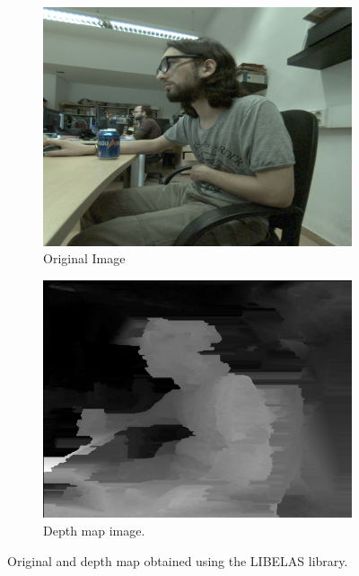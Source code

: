 \documentclass[10pt,a4paper,twocolumn,twoside]{article}
\begin{document}
	\begin{figure}
		\centering
		\begin{subfigure}[b]{1\linewidth}
			\includegraphics[width=\linewidth]{img/4}
			\caption{Original Image}
		\end{subfigure}
		\begin{subfigure}[b]{1\linewidth}
			\includegraphics[width=\linewidth]{img/4b}
			\caption{Depth map image.}
		\end{subfigure}
		\caption{Original and depth map obtained using the LIBELAS library.}
		\label{fig:depthmap}
	\end{figure}
	
\end{document}
